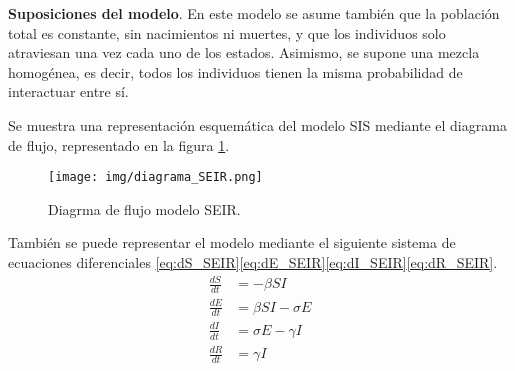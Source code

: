 \textbf{Suposiciones del modelo}. En este modelo se asume también que la población total es constante, sin nacimientos ni muertes, y que los individuos solo atraviesan una vez cada uno de los estados. Asimismo, se supone una mezcla homogénea, es decir, todos los individuos tienen la misma probabilidad de interactuar entre sí.



Se muestra una representación esquemática del modelo SIS mediante el diagrama de flujo, representado en la figura \ref{fig:diagrama SEIR}.
\begin{figure}[H]
    \centering
    \texttt{[image: img/diagrama\_SEIR.png]}
    \caption{Diagrma de flujo modelo SEIR.}
    \label{fig:diagrama SEIR}
    
\end{figure}

También se puede representar el modelo mediante el siguiente sistema de ecuaciones diferenciales \eqref{eq:dS_SEIR}\eqref{eq:dE_SEIR}\eqref{eq:dI_SEIR}\eqref{eq:dR_SEIR}. 
\begin{align}
\frac{dS}{dt} &= -\beta SI \label{eq:dS_SEIR} \\
\frac{dE}{dt} &= \beta SI - \sigma E \label{eq:dE_SEIR} \\
\frac{dI}{dt} &= \sigma E - \gamma I \label{eq:dI_SEIR} \\
\frac{dR}{dt} &= \gamma I \label{eq:dR_SEIR}
\end{align}

